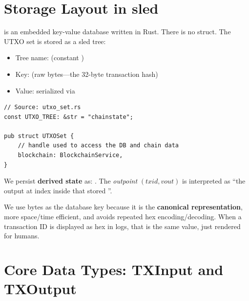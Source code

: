 \section{Storage Layout in sled}
\label{sec:ch09-4-storage-layout}

 is an embedded key-value database written in Rust. There is no  struct. The UTXO set is stored as a sled tree:

\begin{itemize}
  \item Tree name:  (constant )
  \item Key:  (raw bytes---the 32-byte transaction hash)
  \item Value:  serialized via 
\end{itemize}

\begin{listing}[htbp]
\caption{UTXO tree structure and handle}
\label{lst:ch09-4-1}
\begin{verbatim}
// Source: utxo_set.rs
const UTXO_TREE: &str = "chainstate";

pub struct UTXOSet {
    // handle used to access the DB and chain data
    blockchain: BlockchainService,
}
\end{verbatim}
\end{listing}

\begin{notebox}
We persist \textbf{derived state} as: . The \emph{outpoint} \((txid, vout)\) is interpreted as ``the output at index  inside that stored ''.

We use bytes as the database key because it is the \textbf{canonical representation}, more space/time efficient, and avoids repeated hex encoding/decoding. When a transaction ID is displayed as hex in logs, that is the same value, just rendered for humans.
\end{notebox}

\section{Core Data Types: TXInput and TXOutput}
\label{sec:ch09-4-datatypes}

